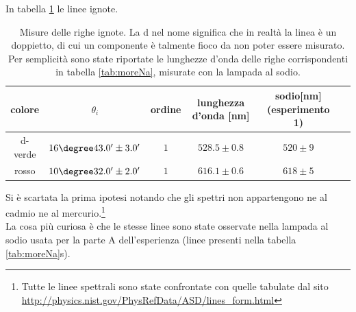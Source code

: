 \documentclass[a4paper,10pt]{article}
\begin{document}
{{{{{{{In tabella \ref{tab:Cur} le linee ignote.


\begin{table}[H]
\centering
\begin{tabular}{c|c|c|c|c|c}
colore & $\theta_i$ & ordine & lunghezza d'onda [nm] & sodio[nm](esperimento 1) \\
\hline
d-verde&  $ 16\degree 43.0' \pm 3.0 ' $   &  $ 1 $ & $ 528.5 \pm 0.8 $  & $520 \pm 9$\\
rosso  &  $ 10\degree 32.0' \pm 2.0 ' $  &  $ 1 $ & $ 616.1 \pm 0.6 $ & $ 618 \pm 5 $\\
\end{tabular}
\caption{Misure delle righe ignote. La d nel nome significa che in realtà la linea è un doppietto, di cui un componente è talmente fioco da non poter essere misurato. Per semplicità sono state riportate le lunghezze d'onda delle righe corrispondenti in tabella \ref{tab:moreNa}, misurate con la lampada al sodio.}
\label{tab:Cur}
\end{table}

Si è scartata la prima ipotesi notando che gli spettri non appartengono ne al cadmio ne al mercurio.\footnote{Tutte le linee spettrali sono state confrontate con quelle tabulate dal sito \url{http://physics.nist.gov/PhysRefData/ASD/lines_form.html}}\\


La cosa più curiosa è che le stesse linee sono state osservate nella lampada al sodio usata per la parte A dell'esperienza (linee presenti nella tabella \ref{tab:moreNa}s).

}}}}}}}
\end{document}
